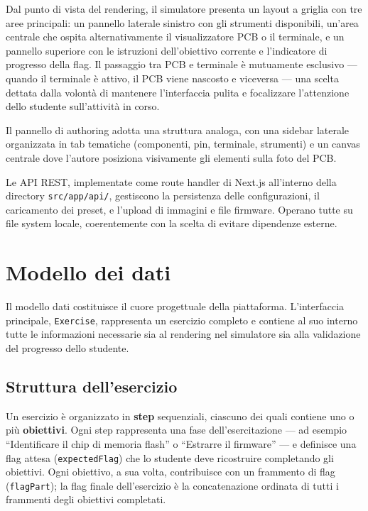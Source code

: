 Dal punto di vista del rendering, il simulatore presenta un layout a griglia con tre aree principali: un pannello laterale sinistro con gli strumenti disponibili, un'area centrale che ospita alternativamente il visualizzatore PCB o il terminale, e un pannello superiore con le istruzioni dell'obiettivo corrente e l'indicatore di progresso della flag. Il passaggio tra PCB e terminale è mutuamente esclusivo --- quando il terminale è attivo, il PCB viene nascosto e viceversa --- una scelta dettata dalla volontà di mantenere l'interfaccia pulita e focalizzare l'attenzione dello studente sull'attività in corso.

Il pannello di authoring adotta una struttura analoga, con una sidebar laterale organizzata in tab tematiche (componenti, pin, terminale, strumenti) e un canvas centrale dove l'autore posiziona visivamente gli elementi sulla foto del PCB.

Le API REST, implementate come route handler di Next.js all'interno della directory \texttt{src/app/api/}, gestiscono la persistenza delle configurazioni, il caricamento dei preset, e l'upload di immagini e file firmware. Operano tutte su file system locale, coerentemente con la scelta di evitare dipendenze esterne.


\section{Modello dei dati}
\label{sec:modello-dati}

Il modello dati costituisce il cuore progettuale della piattaforma. L'interfaccia principale, \texttt{Exercise}, rappresenta un esercizio completo e contiene al suo interno tutte le informazioni necessarie sia al rendering nel simulatore sia alla validazione del progresso dello studente.

\subsection{Struttura dell'esercizio}
\label{subsec:struttura-esercizio-prog}

Un esercizio è organizzato in \textbf{step} sequenziali, ciascuno dei quali contiene uno o più \textbf{obiettivi}. Ogni step rappresenta una fase dell'esercitazione --- ad esempio ``Identificare il chip di memoria flash'' o ``Estrarre il firmware'' --- e definisce una flag attesa (\texttt{expectedFlag}) che lo studente deve ricostruire completando gli obiettivi. Ogni obiettivo, a sua volta, contribuisce con un frammento di flag (\texttt{flagPart}); la flag finale dell'esercizio è la concatenazione ordinata di tutti i frammenti degli obiettivi completati.

